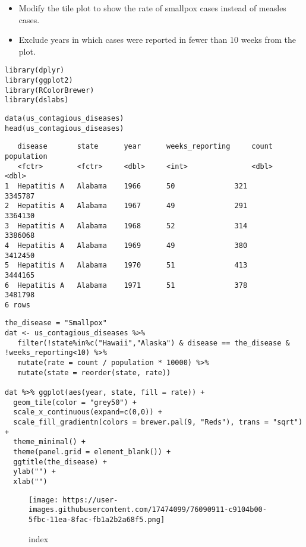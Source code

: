 \documentclass[]{article}
\providecommand{\tightlist}{%
  \setlength{\itemsep}{0pt}\setlength{\parskip}{0pt}}
\begin{document}
\begin{itemize}
\tightlist
\item
  Modify the tile plot to show the rate of smallpox cases instead of
  measles cases.
\item
  Exclude years in which cases were reported in fewer than 10 weeks from
  the plot.
\end{itemize}

\begin{verbatim}
library(dplyr)
library(ggplot2)
library(RColorBrewer)
library(dslabs)
\end{verbatim}

\begin{verbatim}
data(us_contagious_diseases)
head(us_contagious_diseases)
\end{verbatim}

\begin{verbatim}
   disease       state      year      weeks_reporting     count      population
   <fctr>        <fctr>     <dbl>     <int>               <dbl>      <dbl>
1  Hepatitis A   Alabama    1966      50              321        3345787
2  Hepatitis A   Alabama    1967      49              291        3364130
3  Hepatitis A   Alabama    1968      52              314        3386068
4  Hepatitis A   Alabama    1969      49              380        3412450
5  Hepatitis A   Alabama    1970      51              413        3444165
6  Hepatitis A   Alabama    1971      51              378        3481798
6 rows
\end{verbatim}

\begin{verbatim}
the_disease = "Smallpox"
dat <- us_contagious_diseases %>% 
   filter(!state%in%c("Hawaii","Alaska") & disease == the_disease & !weeks_reporting<10) %>% 
   mutate(rate = count / population * 10000) %>% 
   mutate(state = reorder(state, rate))

dat %>% ggplot(aes(year, state, fill = rate)) + 
  geom_tile(color = "grey50") + 
  scale_x_continuous(expand=c(0,0)) + 
  scale_fill_gradientn(colors = brewer.pal(9, "Reds"), trans = "sqrt") + 
  theme_minimal() + 
  theme(panel.grid = element_blank()) + 
  ggtitle(the_disease) + 
  ylab("") + 
  xlab("")
\end{verbatim}

\begin{figure}
\centering
\texttt{[image: https://user-images.githubusercontent.com/17474099/76090911-c9104b00-5fbc-11ea-8fac-fb1a2b2a68f5.png]}
\caption{index}
\end{figure}
\end{document}
